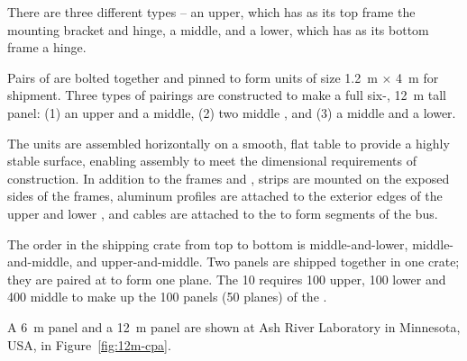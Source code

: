 There are three different  types  -- an upper, which has as its top frame the  mounting bracket and  hinge, a middle, and a lower, which has as its bottom frame a  hinge.  

Pairs of  are bolted together and pinned to form  units of size \SI{1.2}{\m} $\times$ \SI{4}{\m} for shipment. Three types of pairings are constructed to make a full six-, \SI{12}{\m} tall  panel: (1) an upper and a middle, (2) two middle , and (3) a middle and a lower.

The  units are assembled horizontally on a smooth, flat table to provide a highly stable surface, enabling assembly to meet the dimensional requirements of  construction.  
In addition to the frames and , 
 strips are mounted on the exposed sides of the \frfour frames, aluminum profiles are attached to the exterior edges of the upper and lower , 
and cables are attached to the  to form segments of the  bus.  

The order in the shipping crate from top to bottom is middle-and-lower, middle-and-middle, and upper-and-middle.   Two  panels are shipped together in one crate; they are paired at \surf to form one  plane.  The \SI{10}{\kt}  requires 100 upper, 100 lower and 400 middle  to make up the 100  panels (50  planes) of the .

A \SI{6}{\m}   panel and a \SI{12}{\m}   panel are shown at Ash River Laboratory in Minnesota, USA,  in Figure~\ref{fig:12m-cpa}.


